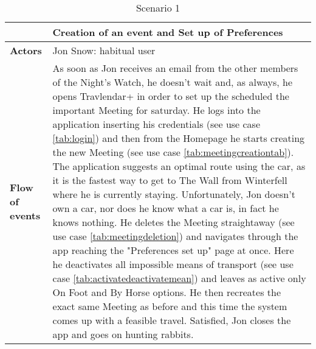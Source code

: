 \begin{table}[htp]
\begin{tabular}{lp{9cm}}
\hline
\bf\large  &\bf\large Creation of an event and Set up of Preferences\\
\hline
\hline

\bf Actors&Jon Snow: habitual user\\
\hline
\bf Flow of events&
As soon as Jon receives  an email from the other members of the Night's Watch, he doesn't wait and, as always, he opens Travlendar+ in order to set up the scheduled the important Meeting for saturday.
He logs into the application inserting his credentials (see use case \autoref{tab:login}) and then from the Homepage he starts creating the new Meeting (see use case \autoref{tab:meetingcreationtab}).
The application suggests an optimal route using the car, as it is the fastest way to get to The Wall from Winterfell where he is currently staying.
Unfortunately, Jon doesn't own a car, nor does he know what a car is, in fact he knows nothing. 
He deletes the Meeting straightaway (see use case \autoref{tab:meetingdeletion}) and navigates through the app reaching the "Preferences set up" page at once.
Here he deactivates all impossible means of transport (see use case \autoref{tab:activatedeactivatemean}) and leaves as active only On Foot and By Horse options.
He then recreates the exact same Meeting as before and this time the system comes up with a feasible travel.
Satisfied, Jon closes the app and goes on hunting rabbits. 



\end{tabular}
\caption{Scenario 1} 
\label{tab:scenarioone}
\end{table}